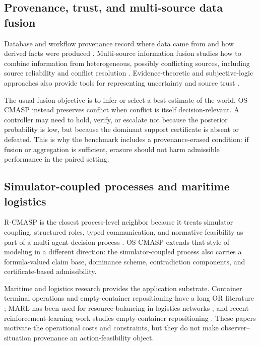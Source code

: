 \documentclass[11pt]{article}
\newcommand{\OSCMASP}{\mbox{\normalfont\textsc{OS-CMASP}}}
\newcommand{\1}{\mathbf{1}}
\theoremstyle{definition}
\theoremstyle{plain}
\theoremstyle{remark}
\begin{document}
\subsection{Provenance, trust, and multi-source data fusion}

Database and workflow provenance record where data came from and how derived facts were produced \citep{Buneman2001Provenance,Cheney2009Provenance,Moreau2013PROV}. Multi-source information fusion studies how to combine information from heterogeneous, possibly conflicting sources, including source reliability and conflict resolution \citep{HallLlinas1997Fusion,Li2024MSIF,DongNaumann2009DataFusion}. Evidence-theoretic and subjective-logic approaches also provide tools for representing uncertainty and source trust \citep{Dempster1967,Shafer1976,Josang2016SubjectiveLogic}.

The usual fusion objective is to infer or select a best estimate of the world. \OSCMASP{} instead preserves conflict when conflict is itself decision-relevant. A controller may need to hold, verify, or escalate not because the posterior probability is low, but because the dominant support certificate is absent or defeated. This is why the benchmark includes a provenance-erased condition: if fusion or aggregation is sufficient, erasure should not harm admissible performance in the paired setting.

\subsection{Simulator-coupled processes and maritime logistics}

R-CMASP is the closest process-level neighbor because it treats simulator coupling, structured roles, typed communication, and normative feasibility as part of a multi-agent decision process \citep{Dong2025RCMASP}. \OSCMASP{} extends that style of modeling in a different direction: the simulator-coupled process also carries a formula-valued claim base, dominance scheme, contradiction components, and certificate-based admissibility.

Maritime and logistics research provides the application substrate. Container terminal operations and empty-container repositioning have a long OR literature \citep{Steenken2004,SongDong2012}; MARL has been used for resource balancing in logistics networks \citep{Li2019LogisticsMARL}; and recent reinforcement-learning work studies empty-container repositioning \citep{Xu2024ECRRL}. These papers motivate the operational costs and constraints, but they do not make observer--situation provenance an action-feasibility object.
\end{document}
